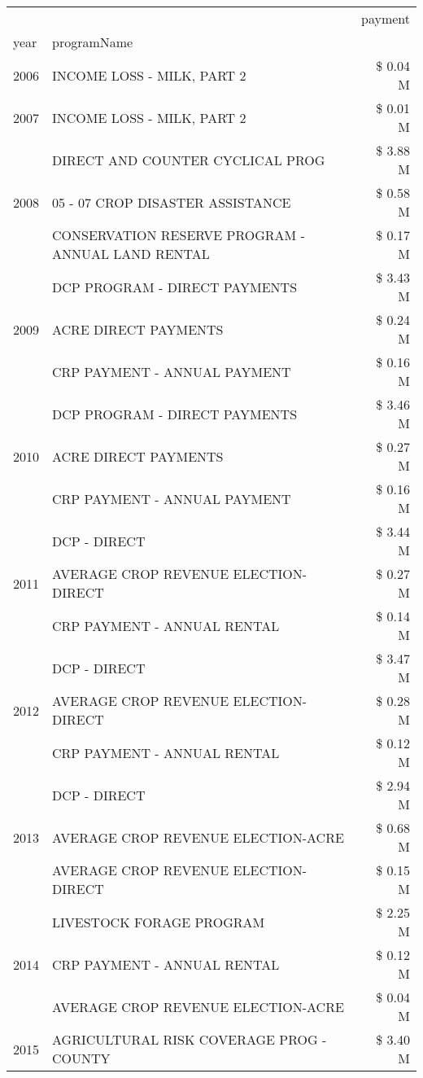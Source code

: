 \begin{tabular}{llr}
\toprule
 &  & payment \\
year & programName &  \\
\midrule
2006 & INCOME LOSS - MILK, PART 2 & \$ 0.04 M \\
\cline{1-3}
2007 & INCOME LOSS - MILK, PART 2 & \$ 0.01 M \\
\cline{1-3}
\multirow[t]{3}{*}{2008} & DIRECT AND COUNTER CYCLICAL PROG & \$ 3.88 M \\
 & 05 - 07 CROP DISASTER ASSISTANCE & \$ 0.58 M \\
 & CONSERVATION RESERVE PROGRAM - ANNUAL LAND RENTAL & \$ 0.17 M \\
\cline{1-3}
\multirow[t]{3}{*}{2009} & DCP PROGRAM - DIRECT PAYMENTS & \$ 3.43 M \\
 & ACRE DIRECT PAYMENTS & \$ 0.24 M \\
 & CRP PAYMENT - ANNUAL PAYMENT & \$ 0.16 M \\
\cline{1-3}
\multirow[t]{3}{*}{2010} & DCP PROGRAM - DIRECT PAYMENTS & \$ 3.46 M \\
 & ACRE DIRECT PAYMENTS & \$ 0.27 M \\
 & CRP PAYMENT - ANNUAL PAYMENT & \$ 0.16 M \\
\cline{1-3}
\multirow[t]{3}{*}{2011} & DCP - DIRECT & \$ 3.44 M \\
 & AVERAGE CROP REVENUE ELECTION-DIRECT & \$ 0.27 M \\
 & CRP PAYMENT - ANNUAL RENTAL & \$ 0.14 M \\
\cline{1-3}
\multirow[t]{3}{*}{2012} & DCP - DIRECT & \$ 3.47 M \\
 & AVERAGE CROP REVENUE ELECTION-DIRECT & \$ 0.28 M \\
 & CRP PAYMENT - ANNUAL RENTAL & \$ 0.12 M \\
\cline{1-3}
\multirow[t]{3}{*}{2013} & DCP - DIRECT & \$ 2.94 M \\
 & AVERAGE CROP REVENUE ELECTION-ACRE & \$ 0.68 M \\
 & AVERAGE CROP REVENUE ELECTION-DIRECT & \$ 0.15 M \\
\cline{1-3}
\multirow[t]{3}{*}{2014} & LIVESTOCK FORAGE PROGRAM & \$ 2.25 M \\
 & CRP PAYMENT - ANNUAL RENTAL & \$ 0.12 M \\
 & AVERAGE CROP REVENUE ELECTION-ACRE & \$ 0.04 M \\
\cline{1-3}
\multirow[t]{3}{*}{2015} & AGRICULTURAL RISK COVERAGE PROG - COUNTY & \$ 3.40 M \\

\end{tabular}
